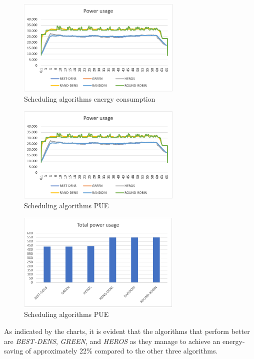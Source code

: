 \begin{figure}[h]
    \centering
    \includegraphics[width=0.7\textwidth]{chapters/images/schedulers_energyconsumption.png}
    \caption{Scheduling algorithms energy consumption}
    \label{fig:schedulers_energyconsumption}
\end{figure}

\begin{figure}[h]
    \centering
    \includegraphics[width=0.7\textwidth]{chapters/images/schedulers_energyconsumption.png}
    \caption{Scheduling algorithms PUE}
    \label{fig:schedulers_pue}
\end{figure}

\begin{figure}[h]
    \centering
    \includegraphics[width=0.7\textwidth]{chapters/images/schedulers_totalconsumption.png}
    \caption{Scheduling algorithms PUE}
    \label{fig:schedulers_totalconsumption}
\end{figure}
As indicated by the charts, it is evident that the algorithms that perform better are \emph{BEST-DENS}, \emph{GREEN}, and \emph{HEROS} as they manage to achieve an energy-saving of approximately 22\% compared to the other three algorithms.
